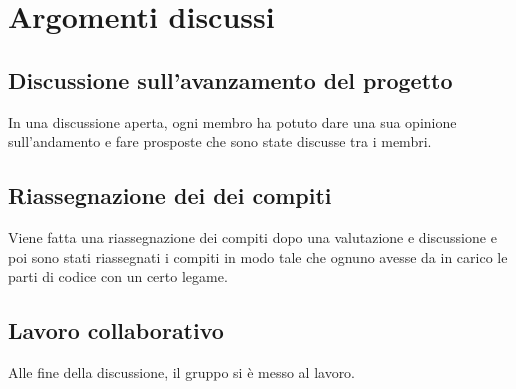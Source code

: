 \documentclass[a4paper,11pt]{article}
\begin{document}
	\newpage
	\section{Argomenti discussi}
		\subsection{Discussione sull'avanzamento del progetto}
		In una discussione aperta, ogni membro ha potuto dare una sua opinione sull'andamento e fare prosposte che sono state discusse tra i membri. 
		\subsection{Riassegnazione dei dei compiti}
		Viene fatta una riassegnazione dei compiti dopo una valutazione e discussione  e poi sono stati riassegnati i compiti in modo tale che ognuno avesse da in carico le parti di codice con un certo legame. 
		\subsection{Lavoro collaborativo}
		Alle fine della discussione, il gruppo si è messo al lavoro.
		
		
		
		
\end{document}
